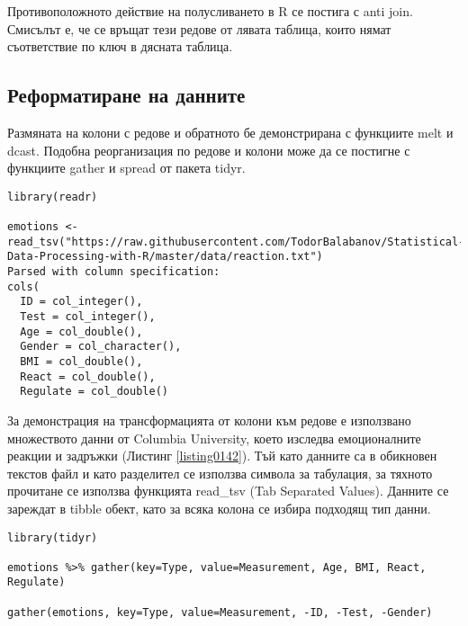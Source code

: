 Противоположното действие на полусливането в R се постига с anti join. Смисълът е, че се връщат тези редове от лявата таблица, които нямат съответствие по ключ в дясната таблица.

\subsection{Реформатиране на данните}

Размяната на колони с редове и обратното бе демонстрирана с функциите melt и dcast. Подобна реорганизация по редове и колони може да се постигне с функциите gather и spread от пакета tidyr.

\begin{lstlisting}[caption=Данни за реакциите, label=listing0142]
library(readr)

emotions <- read_tsv("https://raw.githubusercontent.com/TodorBalabanov/Statistical-Data-Processing-with-R/master/data/reaction.txt")
Parsed with column specification:
cols(
  ID = col_integer(),
  Test = col_integer(),
  Age = col_double(),
  Gender = col_character(),
  BMI = col_double(),
  React = col_double(),
  Regulate = col_double()
\end{lstlisting}

За демонстрация на трансформацията от колони към редове е използвано множеството данни от Columbia University, което изследва емоционалните реакции и задръжки (Листинг \ref{listing0142}). Тъй като данните са в обикновен текстов файл и като разделител се използва символа за табулация, за тяхното прочитане се използва функцията read\_tsv (Tab Separated Values). Данните се зареждат в tibble обект, като за всяка колона се избира подходящ тип данни.

\begin{lstlisting}[caption=Свиване от колони в редове, label=listing0143]
library(tidyr)

emotions %>% gather(key=Type, value=Measurement, Age, BMI, React, Regulate)

gather(emotions, key=Type, value=Measurement, -ID, -Test, -Gender)
\end{lstlisting}


